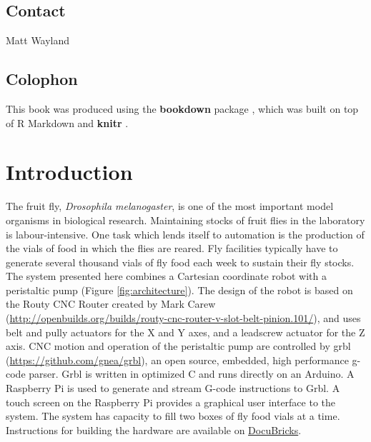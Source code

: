 \documentclass[]{book}
\theoremstyle{definition}
\theoremstyle{definition}
\theoremstyle{remark}
\begin{document}
\section*{Contact}\label{contact}

Matt Wayland

\section*{Colophon}\label{colophon}

This book was produced using the \textbf{bookdown} package
\citep{R-bookdown}, which was built on top of R Markdown and
\textbf{knitr} \citep{xie2015}.

\chapter{Introduction}\label{intro}

The fruit fly, \emph{Drosophila melanogaster}, is one of the most
important model organisms in biological research. Maintaining stocks of
fruit flies in the laboratory is labour-intensive. One task which lends
itself to automation is the production of the vials of food in which the
flies are reared. Fly facilities typically have to generate several
thousand vials of fly food each week to sustain their fly stocks. The
system presented here combines a Cartesian coordinate robot with a
peristaltic pump (Figure \ref{fig:architecture}). The design of the
robot is based on the Routy CNC Router created by Mark Carew
(\url{http://openbuilds.org/builds/routy-cnc-router-v-slot-belt-pinion.101/}),
and uses belt and pully actuators for the X and Y axes, and a leadscrew
actuator for the Z axis. CNC motion and operation of the peristaltic
pump are controlled by grbl (\url{https://github.com/gnea/grbl}), an
open source, embedded, high performance g-code parser. Grbl is written
in optimized C and runs directly on an Arduino. A Raspberry Pi is used
to generate and stream G-code instructions to Grbl. A touch screen on
the Raspberry Pi provides a graphical user interface to the system. The
system has capacity to fill two boxes of fly food vials at a time.
Instructions for building the hardware are available on
\href{http://docubricks.com/viewer.jsp?id=8652757760093769728}{DocuBricks}.
\end{document}
